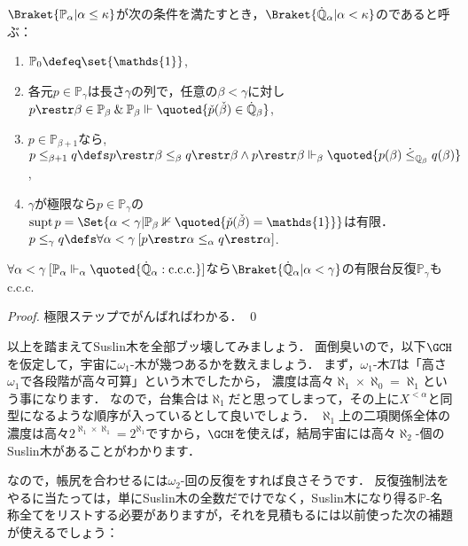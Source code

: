 \documentclass[a4j]{ltjsarticle}
\renewcommand{\emph}[1]{\textsf{\textgt{#1}}}
\begin{document}
\begin{definition}
 $\Braket{\mathbb{P}_\alpha | \alpha \leq \kappa}$が次の条件を満たすとき，$\Braket{\dot{\mathbb{Q}}_\alpha | \alpha < \kappa}$の\emph{有限台反復強制法}であると呼ぶ：
 \begin{enumerate}
  \item $\mathbb{P}_0 \defeq \set{\mathds{1}}$,
  \item 各元$p \in \mathbb{P}_\gamma$は長さ$\gamma$の列で，任意の$\beta < \gamma$に対し$p \restr \beta \in \mathbb{P}_\beta \mathbin{\&} \mathbb{P}_\beta \Vdash \quoted{\check{p}(\check{\beta}) \in \dot{\mathbb{Q}}_\beta}$,
  \item $p \in \mathbb{P}_{\beta + 1}$なら,
        $p \leq_{\beta+1} q \defs p \restr \beta \leq_\beta q \restr \beta \wedge p \restr \beta \Vdash_\beta \quoted{p(\beta) \mathrel{\dot{\leq}_{\mathbb{Q}_\beta}} q(\beta)}$,
  \item $\gamma$が極限なら$p \in \mathbb{P}_\gamma$の\emph{台}$\mathop{\mathrm{supt}}{p} = \Set{\alpha < \gamma | \mathbb{P}_\beta \nVdash \quoted{\check{p}(\check{\beta}) = \mathds{1}}}$は有限．
        $p \leq_\gamma q \defs \forall \alpha < \gamma \: [p\restr \alpha \leq_\alpha q \restr \alpha]$.
 \end{enumerate}
\end{definition}

\begin{fact}
 $\forall \alpha < \gamma \: [\mathbb{P}_\alpha \Vdash_\alpha \quoted{\dot{\mathbb{Q}}_\alpha: \text{c.c.c.}}]$なら$\Braket{\dot{\mathbb{Q}}_\alpha | \alpha < \gamma}$の有限台反復$\mathbb{P}_\gamma$もc.c.c.
\end{fact}
\begin{proof}
 極限ステップでがんばればわかる． \qed
\end{proof}

以上を踏まえてSuslin木を全部ブッ壊してみましょう．
面倒臭いので，以下$\GCH$を仮定して，宇宙に$\omega_1$-木が幾つあるかを数えましょう．
まず，$\omega_1$-木$T$は「高さ$\omega_1$で各段階が高々可算」という木でしたから，
濃度は高々$\aleph_1 \times \aleph_0 = \aleph_1$という事になります．
なので，台集合は$\aleph_1$だと思ってしまって，その上に$X^{<\alpha}$と同型になるような順序が入っているとして良いでしょう．
$\aleph_1$上の二項関係全体の濃度は高々$2^{\aleph_1 \times \aleph_1} = 2^{\aleph_1}$ですから，$\GCH$を使えば，結局宇宙には高々$\aleph_2$-個のSuslin木があることがわかります．

なので，帳尻を合わせるには$\omega_2$-回の反復をすれば良さそうです．
反復強制法をやるに当たっては，単にSuslin木の全数だでけでなく，Suslin木になり得る$\mathbb{P}$-名称全てをリストする必要がありますが，それを見積もるには以前使った次の補題が使えるでしょう：
\end{document}
